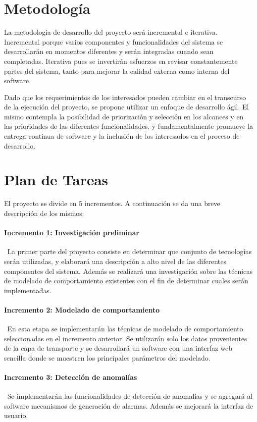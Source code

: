 \section*{Metodología}

La metodología de desarrollo del proyecto será incremental e iterativa. Incremental porque varios componentes y funcionalidades del sistema se desarrollarán en momentos diferentes y serán integradas cuando sean completadas. Iterativa pues se invertirán esfuerzos en revisar constantemente partes del sistema, tanto para mejorar la calidad externa como interna del software\cite{ISOIEC9126}.

Dado que los requerimientos de los interesados pueden cambiar en el transcurso de la ejecución del proyecto, se propone utilizar un enfoque de desarrollo ágil. El mismo contempla la posibilidad de priorización y selección en los alcances y en las prioridades de las diferentes funcionalidades, y fundamentalmente promueve la entrega continua de software y la inclusión de los interesados en el proceso de desarrollo.

\section*{Plan de Tareas}

El proyecto se divide en 5 incrementos. A continuación se da una breve descripción de los mismos:

\paragraph{Incremento 1: Investigación preliminar}\
La primer parte del proyecto consiste en determinar que conjunto de tecnologías serán utilizadas, y elaborará una descripción a alto nivel de las diferentes componentes del sistema. Además se realizará una investigación sobre las técnicas de modelado de comportamiento existentes con el fin de determinar cuales serán implementadas.
\paragraph{Incremento 2: Modelado de comportamiento} \
En esta etapa se implementarán las técnicas de modelado de comportamiento seleccionadas en el incremento anterior. Se utilizarán solo los datos provenientes de la capa de transporte y se desarrollará un software con una interfaz web sencilla donde se muestren los principales parámetros del modelado.
\paragraph{Incremento 3: Detección de anomalías} \
Se implementarán las funcionalidades de detección de anomalías y se agregará al software mecanismos de generación de alarmas. Además se mejorará la interfaz de usuario.
